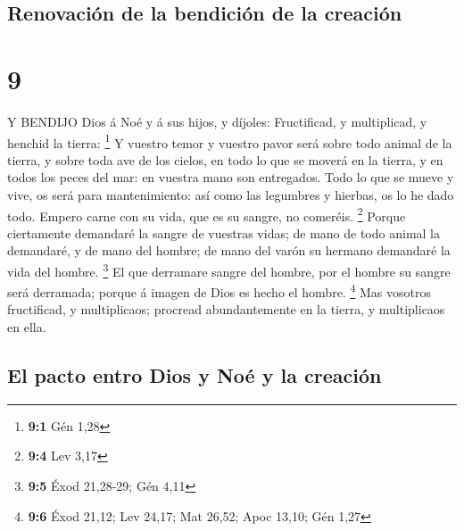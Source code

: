 \hypertarget{renovaciuxf3n-de-la-bendiciuxf3n-de-la-creaciuxf3n}{%
\subsection{Renovación de la bendición de la
creación}\label{renovaciuxf3n-de-la-bendiciuxf3n-de-la-creaciuxf3n}}

\hypertarget{section-8}{%
\section{9}\label{section-8}}

 Y BENDIJO Dios á Noé y á sus hijos, y díjoles: Fructificad,
y multiplicad, y henchid la tierra: \footnote{\textbf{9:1} Gén 1,28}
 Y vuestro temor y vuestro pavor será sobre todo animal de
la tierra, y sobre toda ave de los cielos, en todo lo que se moverá en
la tierra, y en todos los peces del mar: en vuestra mano son entregados.
 Todo lo que se mueve y vive, os será para mantenimiento:
así como las legumbres y hierbas, os lo he dado todo. 
Empero carne con su vida, que es su sangre, no comeréis. \footnote{\textbf{9:4}
  Lev 3,17}  Porque ciertamente demandaré la sangre de
vuestras vidas; de mano de todo animal la demandaré, y de mano del
hombre; de mano del varón su hermano demandaré la vida del hombre.
\footnote{\textbf{9:5} Éxod 21,28-29; Gén 4,11}  El que
derramare sangre del hombre, por el hombre su sangre será derramada;
porque á imagen de Dios es hecho el hombre. \footnote{\textbf{9:6} Éxod
  21,12; Lev 24,17; Mat 26,52; Apoc 13,10; Gén 1,27}  Mas
vosotros fructificad, y multiplicaos; procread abundantemente en la
tierra, y multiplicaos en ella.

\hypertarget{el-pacto-entro-dios-y-nouxe9-y-la-creaciuxf3n}{%
\subsection{El pacto entro Dios y Noé y la
creación}\label{el-pacto-entro-dios-y-nouxe9-y-la-creaciuxf3n}}

